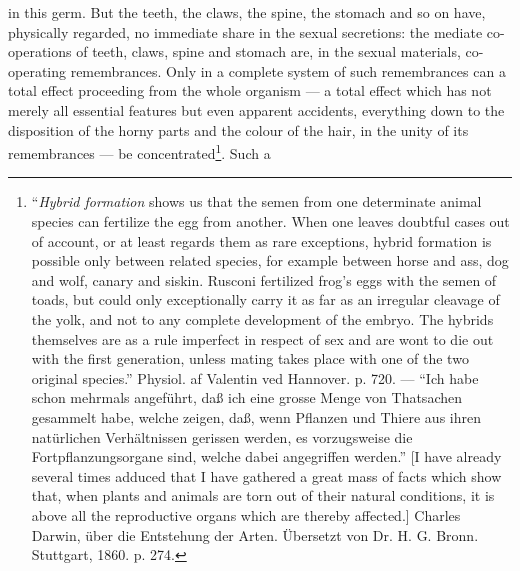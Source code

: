 \documentclass[12pt,a4paper]{book}
\begin{document}
\setcounter{footnote}{0}%
in this germ. But the teeth, the claws, the spine, the stomach and so on have,
physically regarded, no immediate share in the sexual secretions: the mediate
co-operations of teeth, claws, spine and stomach are, in the sexual materials,
co-operating remembrances. Only in a complete system of such remembrances can a
total effect proceeding from the whole organism --- a total effect which has not
merely all essential features but even apparent accidents, everything down to the
disposition of the horny parts and the colour of the hair, in the unity of its
remembrances --- be concentrated\footnote{``\emph{Hybrid formation} shows us that
the semen from one determinate animal species can fertilize the egg from
another. When one leaves doubtful cases out of account, or at least regards them
as rare exceptions, hybrid formation is possible only between related species,
for example between horse and ass, dog and wolf, canary and siskin. Rusconi
fertilized frog's eggs with the semen of toads, but could only exceptionally
carry it as far as an irregular cleavage of the yolk, and not to any complete
development of the embryo. The hybrids themselves are as a rule imperfect in
respect of sex and are wont to die out with the first generation, unless mating
takes place with one of the two original species.'' Physiol. af Valentin ved
Hannover. p. 720. --- ``Ich habe schon mehrmals angeführt, daß ich eine grosse
Menge von Thatsachen gesammelt habe, welche zeigen, daß, wenn Pflanzen und
Thiere aus ihren natürlichen Verhältnissen gerissen werden, es vorzugsweise die
Fortpflanzungsorgane sind, welche dabei angegriffen werden.'' [I have already
several times adduced that I have gathered a great mass of facts which show
that, when plants and animals are torn out of their natural conditions, it is
above all the reproductive organs which are thereby affected.] Charles Darwin,
über die Entstehung der Arten. Übersetzt von Dr. H. G. Bronn. Stuttgart, 1860.
p. 274.}. Such a
\end{document}
